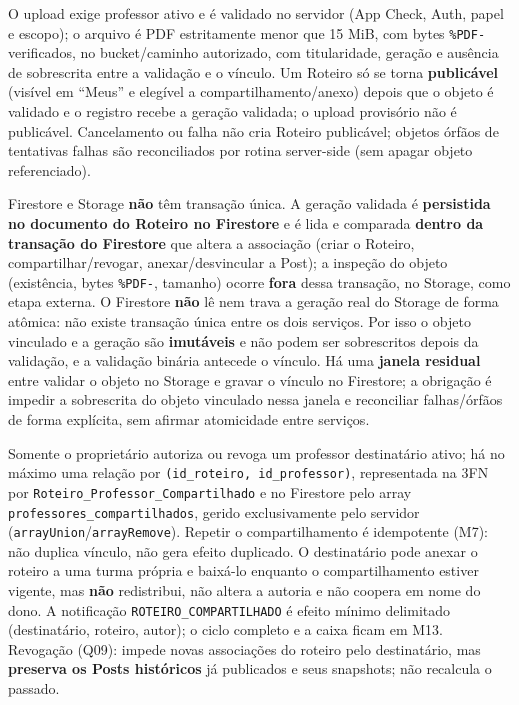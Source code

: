 \begin{regra}
O upload exige professor ativo e é validado no servidor (App Check, Auth, papel
e escopo); o arquivo é PDF estritamente menor que 15 MiB, com bytes
\texttt{\%PDF-} verificados, no bucket/caminho autorizado, com titularidade,
geração e ausência de sobrescrita entre a validação e o vínculo. Um Roteiro só
se torna \textbf{publicável} (visível em ``Meus'' e elegível a
compartilhamento/anexo) depois que o objeto é validado e o registro recebe a
geração validada; o upload provisório não é publicável. Cancelamento ou falha
não cria Roteiro publicável; objetos órfãos de tentativas falhas são
reconciliados por rotina server-side (sem apagar objeto referenciado).

Firestore e Storage \textbf{não} têm transação única. A geração validada é
\textbf{persistida no documento do Roteiro no Firestore} e é lida e comparada
\textbf{dentro da transação do Firestore} que altera a associação (criar o
Roteiro, compartilhar/revogar, anexar/desvincular a Post); a inspeção do objeto
(existência, bytes \texttt{\%PDF-}, tamanho) ocorre \textbf{fora} dessa
transação, no Storage, como etapa externa. O Firestore \textbf{não} lê nem
trava a geração real do Storage de forma atômica: não existe transação única
entre os dois serviços. Por isso o objeto vinculado e a geração são
\textbf{imutáveis} e não podem ser sobrescritos depois da validação, e a
validação binária antecede o vínculo. Há uma \textbf{janela residual} entre
validar o objeto no Storage e gravar o vínculo no Firestore; a obrigação é
impedir a sobrescrita do objeto vinculado nessa janela e reconciliar
falhas/órfãos de forma explícita, sem afirmar atomicidade entre serviços.
\end{regra}

\begin{regra}
Somente o proprietário autoriza ou revoga um professor destinatário ativo; há
no máximo uma relação por \texttt{(id\_roteiro, id\_professor)}, representada na
3FN por \texttt{Roteiro\_Professor\_Compartilhado} e no Firestore pelo array
\texttt{professores\_compartilhados}, gerido exclusivamente pelo servidor
(\texttt{arrayUnion}/\texttt{arrayRemove}). Repetir o compartilhamento é
idempotente (M7): não duplica vínculo, não gera efeito duplicado. O
destinatário pode anexar o roteiro a uma turma própria e baixá-lo enquanto o
compartilhamento estiver vigente, mas \textbf{não} redistribui, não altera a
autoria e não coopera em nome do dono. A notificação
\texttt{ROTEIRO\_COMPARTILHADO} é efeito mínimo delimitado (destinatário,
roteiro, autor); o ciclo completo e a caixa ficam em M13. Revogação (Q09):
impede novas associações do roteiro pelo destinatário, mas \textbf{preserva os
Posts históricos} já publicados e seus snapshots; não recalcula o passado.
\end{regra}

